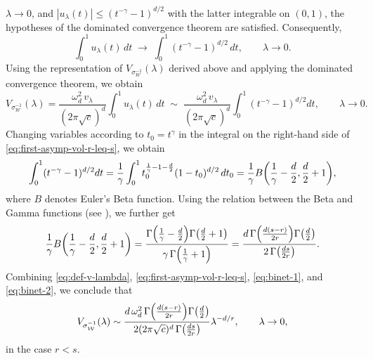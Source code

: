 \documentclass[a4paper,12pt]{article}
\let\originalleft\left
\let\originalright\right
\renewcommand{\left}{\mathopen{}\mathclose\bgroup\originalleft}
\renewcommand{\right}{\aftergroup\egroup\originalright}
\newcommand{\symbolnotsobw}{\symbolnot_{\mathcal{W}}}
\newcommand{\symbolnot}{\sigma}
\begin{document}
$\lambda\to0$, and $|u_\lambda(t)|\le (t^{-\gamma}-1)^{d/2}$ with the latter
integrable on $(0,1)$, the hypotheses of the dominated convergence theorem are
satisfied. Consequently,
\[
\int_0^{1} u_\lambda(t)\,dt
\;\longrightarrow\;
\int_0^{1} (t^{-\gamma}-1)^{d/2}\,dt,
\qquad \lambda\to0 .
\]
Using the representation of $V_{\symbolnotsobw^{-1}}(\lambda)$ derived above
and applying the dominated convergence theorem, we obtain
\begin{equation}\label{eq:first-asymp-vol-r-leq-s}
V_{\symbolnotsobw^{-1}}(\lambda)
=
\frac{\omega_d^2\, v_\lambda}{(2\pi\sqrt{c})^{d}}
\int_0^{1} u_\lambda(t)\,dt
\;\sim\;
\frac{\omega_d^2\, v_\lambda}{(2\pi\sqrt{c})^{d}}
\int_0^{1} (t^{-\gamma}-1)^{d/2} dt,
\qquad \lambda \to 0 .
\end{equation}
Changing variables according to $t_0=t^\gamma$ in the integral on the
right-hand side of \eqref{eq:first-asymp-vol-r-leq-s}, we obtain
\begin{equation}\label{eq:binet-1}
    \int_0^{1} (t^{-\gamma}-1)^{d/2} dt
    =
    \frac{1}{\gamma}
    \int_0^{1}
    t_0^{\frac{1}{\gamma}-1-\frac{d}{2}}
    (1-t_0)^{d/2}
    \,dt_0
    =
    \frac{1}{\gamma}
    B \left(\frac{1}{\gamma}-\frac{d}{2}, \frac{d}{2}+1\right),
\end{equation}
where $B$ denotes Euler’s Beta function. Using the relation between the Beta
and Gamma functions (see \cite[Chapter~2]{artin}), 
we further get 
\begin{equation}\label{eq:binet-2}
    \frac{1}{\gamma}
    B \left(\frac{1}{\gamma}-\frac{d}{2}, \frac{d}{2}+1\right)
    =
    \frac{
        \Gamma \left(\frac{1}{\gamma}-\frac{d}{2}\right)
        \Gamma \left(\frac{d}{2}+1\right)
    }{
        \gamma\,\Gamma \left(\frac{1}{\gamma}+1\right)
    }
    =
    \frac{
        d\,\Gamma \left(\frac{d(s-r)}{2r}\right)\Gamma \left(\frac{d}{2}\right)
    }{
        2\,\Gamma \left(\frac{ds}{2r}\right)
    }.
\end{equation}
Combining \eqref{eq:def-v-lambda}, \eqref{eq:first-asymp-vol-r-leq-s},
\eqref{eq:binet-1}, and \eqref{eq:binet-2}, we conclude that
\begin{equation}\label{eq:final-asymp-vol-r-leq-s}
    V_{\symbolnotsobw^{-1}}(\lambda)
    \sim
    \frac{
        d\,\omega_d^2\,
        \Gamma \left(\frac{d(s-r)}{2r}\right)
        \Gamma \left(\frac{d}{2}\right)
    }{
        2(2\pi\sqrt{c})^{d}\,
        \Gamma \left(\frac{ds}{2r}\right)
    }
    \lambda^{-d/r},
    \qquad \lambda \to 0,
\end{equation}
in the case $r<s$.
\end{document}
